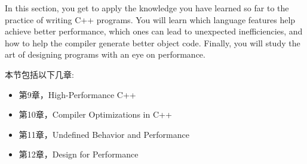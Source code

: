 
In this section, you get to apply the knowledge you have learned so far to the practice of writing C++ programs. You will learn which language features help achieve better performance, which ones can lead to unexpected inefficiencies, and how to help the compiler generate better object code. Finally, you will study the art of designing programs with an eye on performance.

本节包括以下几章:

\begin{itemize}
\item 第9章，High-Performance C++
\item 第10章，Compiler Optimizations in C++
\item 第11章，Undefined Behavior and Performance
\item 第12章，Design for Performance
\end{itemize}

